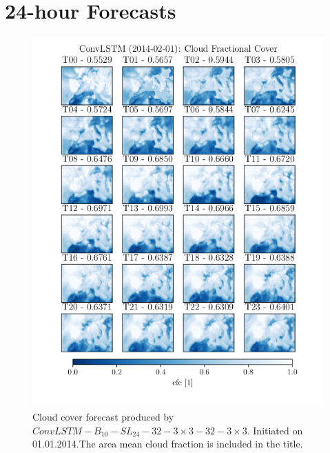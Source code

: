 \chapter{24-hour Forecasts}
\begin{figure}[ht]
    \centering
    \includegraphics{python_figs/timelapse_convlstm_24hrs_from_2014-02-01.png}
    \caption{Cloud cover forecast produced by $ConvLSTM-B_{10}-SL_{24}-32-3\times3-32-3\times3$. Initiated on 01.01.2014.The area mean cloud fraction is included in the title.}
    \label{fig:timelapse_3x3}
\end{figure}

